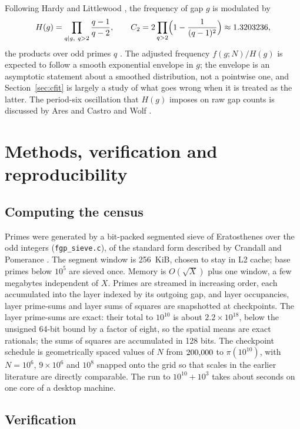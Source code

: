 \documentclass[11pt,a4paper]{article}
\begin{document}
Following Hardy and Littlewood \cite{HardyLittlewood1923}, the frequency of gap $g$ is modulated by
\begin{equation}
H(g)=\prod_{q\mid g,\ q>2}\frac{q-1}{q-2},\qquad C_2=2\prod_{q>2}\Bigl(1-\frac{1}{(q-1)^2}\Bigr)\approx1.3203236,
\end{equation}
the products over odd primes $q$ \cite{CrandallPomerance2005}. The adjusted frequency $f(g;N)/H(g)$ is expected to follow a smooth exponential envelope in $g$; the envelope is an asymptotic statement about a smoothed distribution, not a pointwise one, and Section~\ref{sec:cfit} is largely a study of what goes wrong when it is treated as the latter. The period-six oscillation that $H(g)$ imposes on raw gap counts is discussed by Ares and Castro \cite{AresCastro2006} and Wolf \cite{Wolf2014}.

\section{Methods, verification and reproducibility}
\label{sec:methods}

\subsection{Computing the census}

Primes were generated by a bit-packed segmented sieve of Eratosthenes over the odd integers (\texttt{fgp\_sieve.c}), of the standard form described by Crandall and Pomerance \cite{CrandallPomerance2005}. The segment window is 256~KiB, chosen to stay in L2 cache; base primes below $10^{5}$ are sieved once. Memory is $O(\sqrt X)$ plus one window, a few megabytes independent of $X$. Primes are streamed in increasing order, each accumulated into the layer indexed by its outgoing gap, and layer occupancies, layer prime-sums and layer sums of squares are snapshotted at \nScales{} checkpoints. The layer prime-sums are exact: their total to $10^{10}$ is about $2.2\times10^{18}$, below the unsigned 64-bit bound by a factor of eight, so the spatial means are exact rationals; the sums of squares are accumulated in 128 bits. The checkpoint schedule is \nScales{} geometrically spaced values of $N$ from $200{,}000$ to $\pi(10^{10})$, with $N=10^{6}$, $9\times10^{6}$ and $10^{8}$ snapped onto the grid so that scales in the earlier literature are directly comparable. The run to $10^{10}+10^{3}$ takes about \sieveSeconds{} seconds on one core of a desktop machine.

\subsection{Verification}
\end{document}
